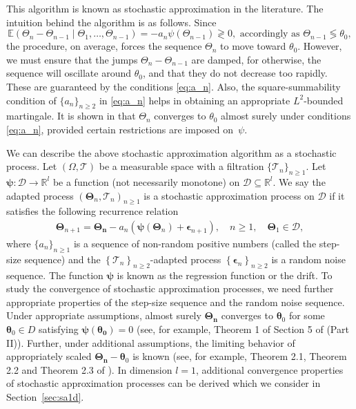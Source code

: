 \documentclass[12pt]{amsart}
\theoremstyle{plain}
\theoremstyle{remark}
\numberwithin{equation}{section}
\begin{document}
This algorithm is known as stochastic approximation in the literature. The intuition behind the algorithm is as follows. Since \[\mathbb{E}\left(\Theta_n - \Theta_{n-1} \mid \Theta_1, \ldots, \Theta_{n-1}\right) = -a_n\psi(\Theta_{n-1}) \gtrless 0, \text{ accordingly as } \Theta_{n-1} \lessgtr \theta_0,\] the procedure, on average, forces the sequence $\Theta_n$ to move toward $\theta_0$. However, we must ensure that the jumps $\Theta_n - \Theta_{n-1}$ are damped, for otherwise, the sequence will oscillate around $\theta_0$, and that they do not decrease too rapidly. These are guaranteed by the conditions \eqref{eq:a_n}. Also, the square-summability condition of $\{a_n\}_{n\geq 2}$ in \eqref{eq:a_n} helps in obtaining an appropriate $L^2$-bounded martingale. It is shown in \cite{robbins1951stochastic} that $\Theta_n$ converges to $\theta_0$ almost surely under conditions \eqref{eq:a_n}, provided certain restrictions are imposed on~$\psi$. 

We can describe the above stochastic approximation algorithm as a stochastic process. Let $\left(\Omega, \mathcal{T}\right)$ be a measurable space with a filtration $\{\mathcal{T}_n\}_{n\geq 1}$. Let $\boldsymbol{\psi} : \mathcal{D} \to \mathbb{R}^l$ be a function (not necessarily monotone) on $\mathcal{D} \subseteq \mathbb{R}^l$. We say the adapted process $\left(\boldsymbol{\Theta}_n, \mathcal{T}_n\right)_{n \geq 1}$ is a stochastic approximation process on $\mathcal{D}$ if it satisfies the following recurrence relation
\begin{align}\label{eq:sa-main}
    \boldsymbol{\Theta}_{n+1} = \boldsymbol{\Theta_n} - a_n\left(\boldsymbol{\psi}(\boldsymbol{\Theta}_n) + \boldsymbol{\epsilon}_{n+1}\right), \quad n \geq 1, \quad \boldsymbol{\Theta}_1 \in \mathcal{D}, 
\end{align}
where $\{a_n\}_{n\geq 1}$ is a sequence of non-random positive numbers (called the step-size sequence) and the $\left\{\mathcal{T}_{n}\right\}_{n \geq 2}$-adapted process {$\left\{\boldsymbol{\epsilon}_{n}\right\}_{n \geq 2}$} is a random noise sequence. The function {$\boldsymbol{\psi}$} is known as the {regression function or the drift}. %
To study the convergence of stochastic approximation processes, we need %
further appropriate properties of the step-size sequence and the random noise sequence. %
Under appropriate assumptions, almost surely $\boldsymbol{\Theta_n}$ converges to $\boldsymbol{\theta}_0$ for some $\boldsymbol{\theta}_0 \in D$ satisfying $\boldsymbol{\psi}(\boldsymbol{\theta_0})=0$ (see, for example, Theorem 1 of Section 5 of \cite{MR1082341} (Part II)). Further, under additional assumptions, the limiting behavior of appropriately scaled $\boldsymbol{\Theta_n} - \boldsymbol{\theta}_0$ is known (see, for example, Theorem 2.1, Theorem 2.2 and Theorem 2.3 of \cite{zhang2016central}). In dimension $l = 1$, additional convergence properties of stochastic approximation processes can be derived which we consider in Section~\ref{sec:sa1d}.
\end{document}

